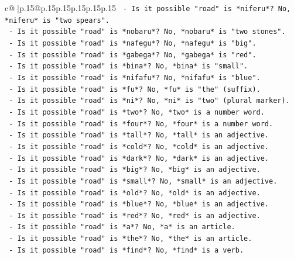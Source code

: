 \documentclass{article}
\begin{document}
{\begin{supertabular}{c@{$\;$}|p{.15\linewidth}@{}p{.15\linewidth}p{.15\linewidth}p{.15\linewidth}p{.15\linewidth}p{.15\linewidth}}
{{{\texttt{            {-} Is it possible "road" is *niferu*? No, *niferu* is "two spears".} \\
\texttt{            {-} Is it possible "road" is *nobaru*? No, *nobaru* is "two stones".} \\
\texttt{            {-} Is it possible "road" is *nafegu*? No, *nafegu* is "big".} \\
\texttt{            {-} Is it possible "road" is *gabega*? No, *gabega* is "red".} \\
\texttt{            {-} Is it possible "road" is *bina*? No, *bina* is "small".} \\
\texttt{            {-} Is it possible "road" is *nifafu*? No, *nifafu* is "blue".} \\
\texttt{            {-} Is it possible "road" is *fu*? No, *fu* is "the" (suffix).} \\
\texttt{            {-} Is it possible "road" is *ni*? No, *ni* is "two" (plural marker).} \\
\texttt{            {-} Is it possible "road" is *two*? No, *two* is a number word.} \\
\texttt{            {-} Is it possible "road" is *four*? No, *four* is a number word.} \\
\texttt{            {-} Is it possible "road" is *tall*? No, *tall* is an adjective.} \\
\texttt{            {-} Is it possible "road" is *cold*? No, *cold* is an adjective.} \\
\texttt{            {-} Is it possible "road" is *dark*? No, *dark* is an adjective.} \\
\texttt{            {-} Is it possible "road" is *big*? No, *big* is an adjective.} \\
\texttt{            {-} Is it possible "road" is *small*? No, *small* is an adjective.} \\
\texttt{            {-} Is it possible "road" is *old*? No, *old* is an adjective.} \\
\texttt{            {-} Is it possible "road" is *blue*? No, *blue* is an adjective.} \\
\texttt{            {-} Is it possible "road" is *red*? No, *red* is an adjective.} \\
\texttt{            {-} Is it possible "road" is *a*? No, *a* is an article.} \\
\texttt{            {-} Is it possible "road" is *the*? No, *the* is an article.} \\
\texttt{            {-} Is it possible "road" is *find*? No, *find* is a verb.} \\
}}}
\end{supertabular}}
\end{document}
